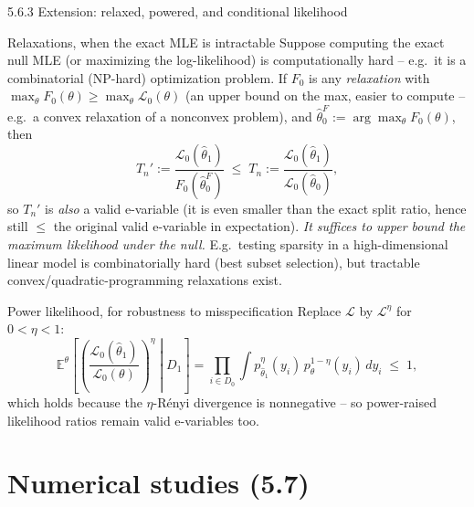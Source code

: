 \documentclass[aspectratio=169,10pt]{beamer}
\newcommand{\E}{\mathbb{E}}
\begin{document}
\begin{frame}[allowframebreaks]{5.6.3 Extension: relaxed, powered, and conditional likelihood}

  \begin{block}{Relaxations, when the exact MLE is intractable}
    Suppose computing the exact null MLE (or maximizing the
    log-likelihood) is computationally hard -- e.g.\ it is a
    combinatorial (NP-hard) optimization problem. If $F_0$ is any
    \emph{relaxation} with $\max_\theta F_0(\theta) \ge \max_\theta \mathcal{L}_0(\theta)$
    (an upper bound on the max, easier to compute -- e.g.\ a convex
    relaxation of a nonconvex problem), and
    $\hat\theta_0^F := \arg\max_\theta F_0(\theta)$, then
    $$ T_n' := \frac{\mathcal{L}_0(\hat\theta_1)}{F_0(\hat\theta_0^F)} \;\le\; T_n := \frac{\mathcal L_0(\hat\theta_1)}{\mathcal L_0(\hat\theta_0)}, $$
    so $T_n'$ is \emph{also} a valid e-variable (it is even smaller than
    the exact split ratio, hence still $\le$ the original valid
    e-variable in expectation). \emph{It suffices to upper bound the
    maximum likelihood under the null.} E.g.\ testing sparsity in a
    high-dimensional linear model is combinatorially hard (best subset
    selection), but tractable convex/quadratic-programming relaxations
    exist.
  \end{block}

  \begin{block}{Power likelihood, for robustness to misspecification}
    Replace $\mathcal L$ by $\mathcal L^\eta$ for $0<\eta<1$:
    $$ \E^\theta\!\left[\left(\frac{\mathcal L_0(\hat\theta_1)}{\mathcal L_0(\theta)}\right)^{\!\eta} \middle| D_1\right]
       = \prod_{i\in D_0}\int p_{\hat\theta_1}^\eta(y_i)\, p_\theta^{1-\eta}(y_i)\, dy_i \;\le\; 1, $$
    which holds because the $\eta$-R\'enyi divergence is nonnegative --
    so power-raised likelihood ratios remain valid e-variables too.
  \end{block}

\end{frame}

\section{Numerical studies (5.7)}
\end{document}
